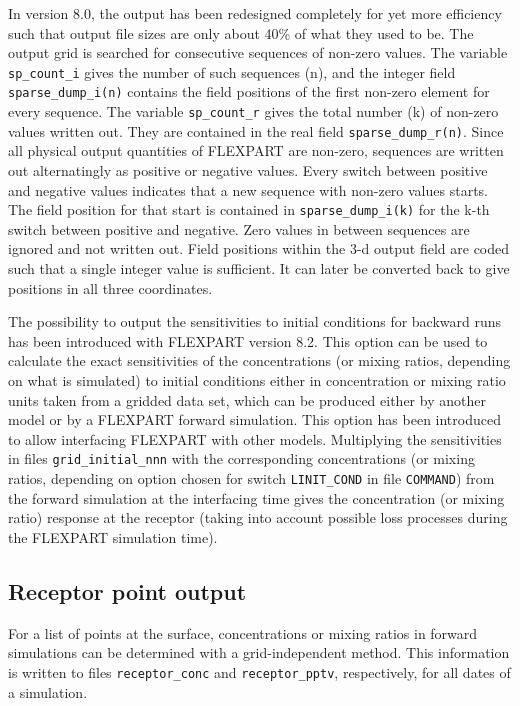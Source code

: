 \documentclass{egu}            %
\begin{document}
In version 8.0, the output has been redesigned completely for yet more efficiency
such that output file sizes are only about 40\% of what they used to be.  The
output grid is searched for consecutive sequences of non-zero values.  The
variable \verb|sp_count_i| gives the number of such sequences (n), and the
integer field \verb|sparse_dump_i(n)| contains the field positions of the first
non-zero element for every sequence.  The variable \verb|sp_count_r| gives the
total number (k) of non-zero values written out.  They are contained in the
real field \verb|sparse_dump_r(n)|.  Since all physical output quantities of
FLEXPART are non-zero, sequences are written out alternatingly as positive or
negative values.  Every switch between positive and negative values indicates
that a new sequence with non-zero values starts.  The field position for that
start is contained in \verb|sparse_dump_i(k)| for the k-th switch between
positive and negative.  Zero values in between sequences are ignored and not
written out.  Field positions within the 3-d output field are coded such that a
single integer value is sufficient.  It can later be converted back to give
positions in all three coordinates.

The possibility to output the sensitivities to initial conditions for backward
runs has been introduced with FLEXPART version 8.2. This option can be used to
calculate the exact sensitivities of the concentrations (or mixing ratios,
depending on what is simulated) to initial conditions either in concentration
or mixing ratio units taken from a gridded data set, which can be produced
either by another model or by a FLEXPART forward simulation.  This option has
been introduced to allow interfacing FLEXPART with other models.  Multiplying
the sensitivities in files \verb|grid_initial_nnn| with the corresponding
concentrations (or mixing ratios, depending on option chosen for switch
\verb|LINIT_COND| in file \verb|COMMAND|) from the forward simulation at the
interfacing time gives the concentration (or mixing ratio) response at the
receptor (taking into account possible loss processes during the FLEXPART
simulation time).

\subsection{Receptor point output}

For a list of points at the surface, concentrations or mixing ratios in forward
simulations can be determined with a grid-independent method.  This information
is written to files \verb|receptor_conc| and \verb|receptor_pptv|,
respectively, for all dates of a simulation.
\end{document}
